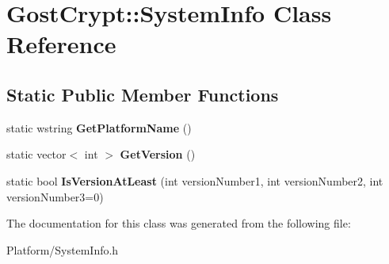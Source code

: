 \hypertarget{class_gost_crypt_1_1_system_info}{}\section{Gost\+Crypt\+:\+:System\+Info Class Reference}
\label{class_gost_crypt_1_1_system_info}
\subsection*{Static Public Member Functions}
\begin{DoxyCompactItemize}
\item 
\mbox{\label{class_gost_crypt_1_1_system_info_a17f9a3a69b849a5e061b937df1ed0645}} 
static wstring {\bfseries Get\+Platform\+Name} ()
\item 
\mbox{\label{class_gost_crypt_1_1_system_info_a757ef45df9433e3d75fbe9cc61cc6cac}} 
static vector$<$ int $>$ {\bfseries Get\+Version} ()
\item 
\mbox{\label{class_gost_crypt_1_1_system_info_a2ce67b357614d6f688103681bb0de8cc}} 
static bool {\bfseries Is\+Version\+At\+Least} (int version\+Number1, int version\+Number2, int version\+Number3=0)
\end{DoxyCompactItemize}


The documentation for this class was generated from the following file\+:\begin{DoxyCompactItemize}
\item 
Platform/System\+Info.\+h\end{DoxyCompactItemize}
